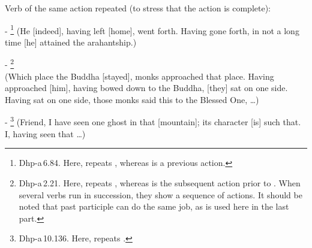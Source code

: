 \begin{compactenum}[(1)]
\item Verb of the same action repeated (to stress that the action is complete):\par
- \footnote{Dhp-a\,6.84. Here,  repeats , whereas  is a previous action.} (He [indeed], having left [home], went forth. Having gone forth, in not a long time [he] attained the arahantship.)\par
- \footnote{Dhp-a\,2.21. Here,  repeats , whereas  is the subsequent action prior to . When several  verbs run in succession, they show a sequence of actions. It should be noted that past participle can do the same job, as  is used here in the last part.} \\(Which place the Buddha [stayed], monks approached that place. Having approached [him], having bowed down to the Buddha, [they] sat on one side. Having sat on one side, those monks said this to the Blessed One, \ldots)\par
- \footnote{Dhp-a\,10.136. Here,  repeats .} (Friend, I have seen one ghost in that [mountain]; its character [is] such that. I, having seen that \ldots)\par


\end{compactenum}

